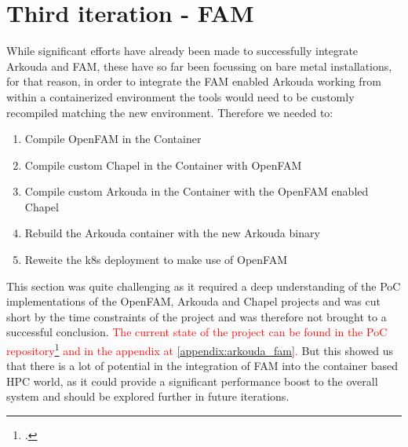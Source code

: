 \section*{Third iteration - \ac{FAM}}
\label{third_iteration_fam}
While significant efforts have already been made to successfully integrate Arkouda and \ac{FAM}, these have so far been focussing on bare metal installations, for that reason, in order to integrate the \ac{FAM} enabled Arkouda working from within a containerized environment the tools would need to be 
customly recompiled matching the new environment. 
Therefore we needed to:

\begin{enumerate}
    \item Compile OpenFAM in the Container
    \item Compile custom Chapel in the Container with OpenFAM
    \item Compile custom Arkouda in the Container with the OpenFAM enabled Chapel
    \item Rebuild the Arkouda container with the new Arkouda binary
    \item Reweite the \ac{k8s} deployment to make use of OpenFAM
\end{enumerate}

This section was quite challenging as it required a deep understanding of the \ac{PoC} implementations of the OpenFAM, Arkouda and Chapel projects and was cut short by the time constraints of the project and was therefore not brought to a successful conclusion.
\textcolor{red}{The current state of the project can be found in the \ac{PoC} repository\footcite{eckerthPoCRepository2023} and in the appendix at \ref{appendix:arkouda_fam}. 
}
But this showed us that there is a lot of potential in the integration of \ac{FAM} into the container based \ac{HPC} world, as it could provide a significant performance boost to the overall system and should be explored further in future iterations.

